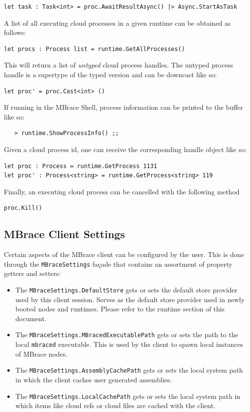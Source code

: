 \documentclass[9pt,a4paper]{article}
\newcommand{\mbrace}{MBrace}
\newcommand{\TitularMbrace}{MBrace}
\begin{document}
\begin{lstlisting}
let task : Task<int> = proc.AwaitResultAsync() |> Async.StartAsTask
\end{lstlisting}
%
A list of all executing cloud processes in a given runtime can be obtained as follows:
\begin{lstlisting}
let procs : Process list = runtime.GetAllProcesses()
\end{lstlisting}
This will return a list of \emph{untyped} cloud process handles. The untyped process handle
is a supertype of the typed version and can be downcast like so:
\begin{lstlisting}
let proc' = proc.Cast<int> ()
\end{lstlisting}
If running in the \mbrace{} Shell, process information can be printed to the buffer like so:
\begin{verbatim}
   > runtime.ShowProcessInfo() ;;
\end{verbatim}
Given a cloud process id, one can receive the corresponding handle object like so:
\begin{lstlisting}
let proc : Process = runtime.GetProcess 1131
let proc' : Process<string> = runtime.GetProcess<string> 119
\end{lstlisting}
Finally, an executing cloud process can be cancelled with the following method
\begin{lstlisting}
proc.Kill()
\end{lstlisting}

\subsection{\TitularMbrace{} Client Settings}

Certain aspects of the \mbrace{} client can be configured by the user.
This is done through the \texttt{MBraceSettings} fa\c{c}ade that contains an
assortment of property getters and setters:
\begin{itemize}
\item The \texttt{MBraceSettings.DefaultStore} gets or sets the default store provider
used by this client session. Serves as the default store provider used in newly booted
nodes and runtimes. Please refer to the runtime section of this document.
\item The \texttt{MBraceSettings.MBracedExecutablePath} gets or sets the path to the
local \texttt{mbraced} executable. This is used by the client to spawn local instances
of \mbrace{} nodes.
\item The \texttt{MBraceSettings.AssemblyCachePath} gets or sets the local system 
path in which the client caches user generated assemblies.
\item The \texttt{MBraceSettings.LocalCachePath} gets or sets the local system path
in which items like cloud refs or cloud files are cached with the client.
\end{itemize}
%
%
%
\end{document}
